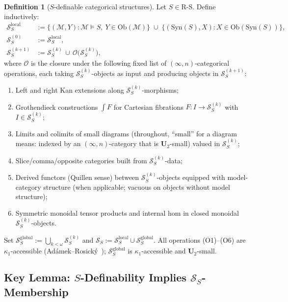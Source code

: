 \documentclass[11pt]{article}
\theoremstyle{plain}
\theoremstyle{definition}
\newtheorem{definition}[theorem]{Definition}
\newcommand{\RS}{\mathrm{R\text{-}S}}
\newcommand{\cS}{\mathcal{S}}
\newcommand{\cM}{\mathcal{M}}
\newcommand{\Ob}{\mathrm{Ob}}
\newcommand{\Syn}{\mathrm{Syn}}
\begin{document}
\begin{definition}[$S$-definable categorical structures]\label{def:SS}
Let $S \in \RS$. Define inductively:
\begin{align*}
\cS_S^{\mathrm{local}} &:= \{(\cM, Y) : \cM \models S,\ Y \in \Ob(\cM)\} \;\cup\; \{(\Syn(S), X) : X \in \Ob(\Syn(S))\}, \\
\cS_S^{(0)} &:= \cS_S^{\mathrm{local}}, \\
\cS_S^{(k+1)} &:= \cS_S^{(k)} \,\cup\, \mathcal{O}\bigl(\cS_S^{(k)}\bigr),
\end{align*}
where $\mathcal{O}$ is the closure under the following fixed list of $(\infty, n)$-categorical operations, each taking $\cS_S^{(k)}$-objects as input and producing objects in $\cS_S^{(k+1)}$:
\begin{enumerate}[nosep,label=\textrm{(O\arabic*)}]
\item Left and right Kan extensions along $\cS_S^{(k)}$-morphisms;
\item Grothendieck constructions $\int F$ for Cartesian fibrations $F : I \to \cS_S^{(k)}$ with $I \in \cS_S^{(k)}$;
\item Limits and colimits of small diagrams (throughout, ``small'' for a diagram means: indexed by an $(\infty, n)$-category that is $\mathbf{U}_2$-small) valued in $\cS_S^{(k)}$;
\item Slice/comma/opposite categories built from $\cS_S^{(k)}$-data;
\item Derived functors (Quillen sense) between $\cS_S^{(k)}$-objects equipped with model-category structure (when applicable; vacuous on objects without model structure);
\item Symmetric monoidal tensor products and internal hom in closed monoidal $\cS_S^{(k)}$-objects.
\end{enumerate}
Set $\cS_S^{\mathrm{global}} := \bigcup_{k < \omega} \cS_S^{(k)}$ and $\cS_S := \cS_S^{\mathrm{local}} \cup \cS_S^{\mathrm{global}}$. All operations (O1)--(O6) are $\kappa_1$-accessible (Ad\'amek--Rosick\'y~\cite{AdamekRosicky1994}); $\cS_S^{\mathrm{global}}$ is $\kappa_1$-accessible and $\mathbf{U}_2$-small.
\end{definition}

\subsection{\texorpdfstring{Key Lemma: $S$-Definability Implies $\cS_S$-Membership}{Key Lemma: S-Definability Implies S\_S-Membership}}
\end{document}
